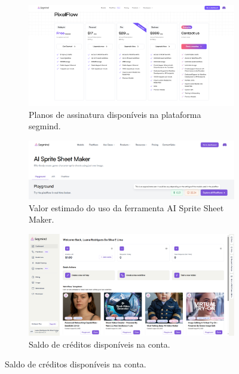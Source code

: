 \begin{figure}[htbp]
    \centering
    \caption{\small Créditos da plataforma}
    \label{fig:segmindLimitado}
    \begin{subfigure}{1\linewidth}
        \includegraphics[width=1\linewidth]{figs/segmind/segmind_preco.PNG}
        \caption{\small Planos de assinatura disponíveis na plataforma segmind.}
        \label{fig:segmindPreco}
    \end{subfigure}
        \begin{subfigure}{1\linewidth}
        \includegraphics[width=1\linewidth]{figs/segmind/segmind_custo.PNG}
        \caption{\small Valor estimado do uso da ferramenta AI Sprite Sheet Maker.}
        \label{fig:segmindCusto}
    \end{subfigure}
    \begin{subfigure}{1\linewidth}
        \includegraphics[width=1\linewidth]{figs/segmind/segmind_creditos.PNG}
        \caption{\small Saldo de créditos disponíveis na conta.}
        \label{fig:segmindCredito}
    \end{subfigure}
\end{figure}

